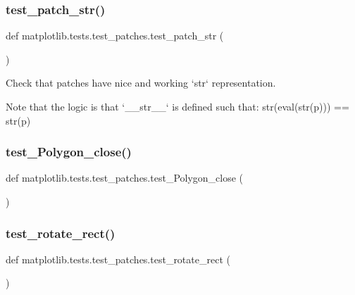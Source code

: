\subsubsection{\texorpdfstring{test\+\_\+patch\+\_\+str()}{test\_patch\_str()}}
{\footnotesize\ttfamily def matplotlib.\+tests.\+test\+\_\+patches.\+test\+\_\+patch\+\_\+str (\begin{DoxyParamCaption}{ }\end{DoxyParamCaption})}

\begin{DoxyVerb}Check that patches have nice and working `str` representation.

Note that the logic is that `__str__` is defined such that:
str(eval(str(p))) == str(p)
\end{DoxyVerb}
 \mbox{\label{namespacematplotlib_1_1tests_1_1test__patches_a24867c348b0d513710f352aa00a6caf7}} 
\subsubsection{\texorpdfstring{test\+\_\+\+Polygon\+\_\+close()}{test\_Polygon\_close()}}
{\footnotesize\ttfamily def matplotlib.\+tests.\+test\+\_\+patches.\+test\+\_\+\+Polygon\+\_\+close (\begin{DoxyParamCaption}{ }\end{DoxyParamCaption})}

\mbox{\label{namespacematplotlib_1_1tests_1_1test__patches_a91bf4e44996526d217ac2794d8c59318}} 
\subsubsection{\texorpdfstring{test\+\_\+rotate\+\_\+rect()}{test\_rotate\_rect()}}
{\footnotesize\ttfamily def matplotlib.\+tests.\+test\+\_\+patches.\+test\+\_\+rotate\+\_\+rect (\begin{DoxyParamCaption}{ }\end{DoxyParamCaption})}

